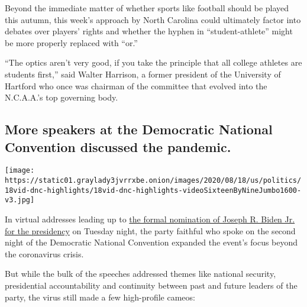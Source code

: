 Beyond the immediate matter of whether sports like football should be
played this autumn, this week's approach by North Carolina could
ultimately factor into debates over players' rights and whether the
hyphen in ``student-athlete'' might be more properly replaced with
``or.''

``The optics aren't very good, if you take the principle that all
college athletes are students first,'' said Walter Harrison, a former
president of the University of Hartford who once was chairman of the
committee that evolved into the N.C.A.A.'s top governing body.

\hypertarget{more-speakers-at-the-democratic-national-convention-discussed-the-pandemic}{%
\subsection{More speakers at the Democratic National Convention
discussed the
pandemic.}\label{more-speakers-at-the-democratic-national-convention-discussed-the-pandemic}}

\texttt{[image: https://static01.graylady3jvrrxbe.onion/images/2020/08/18/us/politics/18vid-dnc-highlights/18vid-dnc-highlights-videoSixteenByNineJumbo1600-v3.jpg]}

In virtual addresses leading up to
\href{https://www.nytimes3xbfgragh.onion/2020/08/18/us/politics/roll-call-pass-dnc.html?action=click\&module=Spotlight\&pgtype=Homepage}{the
formal nomination of Joseph R. Biden Jr. for the presidency} on Tuesday
night, the party faithful who spoke on the second night of the
Democratic National Convention expanded the event's focus beyond the
coronavirus crisis.

But while the bulk of the speeches addressed themes like national
security, presidential accountability and continuity between past and
future leaders of the party, the virus still made a few high-profile
cameos:

